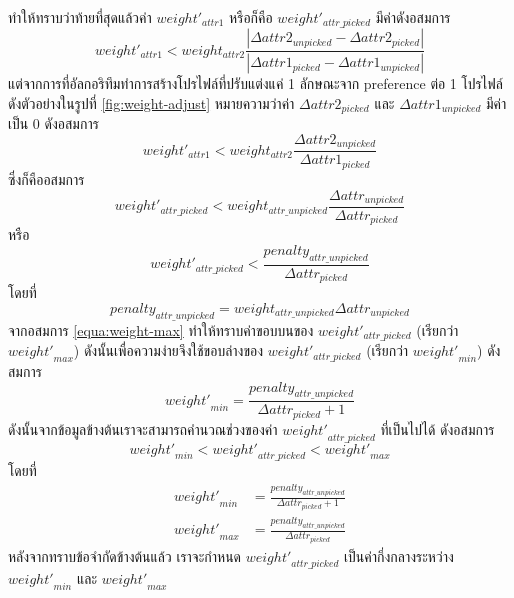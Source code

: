 %
ทำให้ทราบว่าท้ายที่สุดแล้วค่า $\mathit{weight'_\mathit{attr1}}$ หรือก็คือ $\mathit{weight'_\mathit{attr\_picked}}$ 
มีค่าดังอสมการ
\begin{equation}
  \mathit{weight'_\mathit{attr1}} 
  < \mathit{weight_\mathit{attr2}} 
  \frac{|\Delta\mathit{attr2_\mathit{unpicked}} - \Delta\mathit{attr2_\mathit{picked}}|}{|\Delta\mathit{attr1_\mathit{picked}} - \Delta\mathit{attr1_\mathit{unpicked}}|}
\end{equation}
แต่จากการที่อัลกอริทึมทำการสร้างโปรไฟล์ที่ปรับแต่งแค่ 1 ลักษณะจาก preference ต่อ 1 โปรไฟล์ดังตัวอย่างในรูปที่ \ref{fig:weight-adjust} หมายความว่าค่า
$\Delta\mathit{attr2_\mathit{picked}}$ และ $\Delta\mathit{attr1_\mathit{unpicked}}$ มีค่าเป็น 0 ดังอสมการ
\begin{equation}
  \mathit{weight'_\mathit{attr1}} 
  < \mathit{weight_\mathit{attr2}} 
  \frac{\Delta\mathit{attr2_\mathit{unpicked}}}{\Delta\mathit{attr1_\mathit{picked}}}
\end{equation}
ซึ่งก็คืออสมการ
\begin{equation}
  \mathit{weight'_\mathit{attr\_picked}} 
  < \mathit{weight_\mathit{attr\_unpicked}} 
  \frac{\Delta\mathit{attr_\mathit{unpicked}}}{\Delta\mathit{attr_\mathit{picked}}}
\end{equation}
หรือ
\begin{equation}
  \mathit{weight'_\mathit{attr\_picked}} 
  < \frac{penalty_\mathit{attr\_unpicked}}
  {\Delta\mathit{attr_\mathit{picked}}}
  \label{equa:weight-max}
\end{equation}
โดยที่
\begin{equation}
  \mathit{penalty_\mathit{attr\_unpicked}} = \mathit{weight_\mathit{attr\_unpicked}} \Delta\mathit{attr_\mathit{unpicked}}
\end{equation}
จากอสมการ \ref{equa:weight-max} ทำให้ทราบค่าขอบบนของ $\mathit{weight'_\mathit{attr\_picked}}$ 
(เรียกว่า $\mathit{weight'}_\mathit{max}$) ดังนั้นเพื่อความง่ายจึงใช้ขอบล่างของ $\mathit{weight'_\mathit{attr\_picked}}$ 
(เรียกว่า $\mathit{weight'}_\mathit{min}$) ดังสมการ
\begin{equation}
  \mathit{weight'}_\mathit{min} = \frac{\mathit{penalty}_\mathit{attr\_unpicked}}{\Delta \mathit{attr}_\mathit{picked} + 1}
\end{equation}
%
ดังนั้นจากข้อมูลข้างต้นเราจะสามารถคำนวณช่วงของค่า $\mathit{weight'}_\mathit{attr\_picked}$ ที่เป็นไปได้ ดังอสมการ
\begin{equation}
  \mathit{weight'}_\mathit{min}
  < \mathit{weight'}_\mathit{attr\_picked} 
  < \mathit{weight'}_\mathit{max} 
\end{equation}
โดยที่
\begin{align}
  \mathit{weight'}_\mathit{min} &= \frac{\mathit{penalty}_\mathit{attr\_unpicked}}{\Delta \mathit{attr}_\mathit{picked} + 1} \\
  \mathit{weight'}_\mathit{max} &= \frac{\mathit{penalty}_\mathit{attr\_unpicked}}{\Delta \mathit{attr}_\mathit{picked}}
\end{align}
หลังจากทราบข้อจำกัดข้างต้นแล้ว เราจะกำหนด $\mathit{weight'}_\mathit{attr\_picked}$ เป็นค่ากึ่งกลางระหว่าง $\mathit{weight'}_\mathit{min}$ 
และ $\mathit{weight'}_\mathit{max}$

